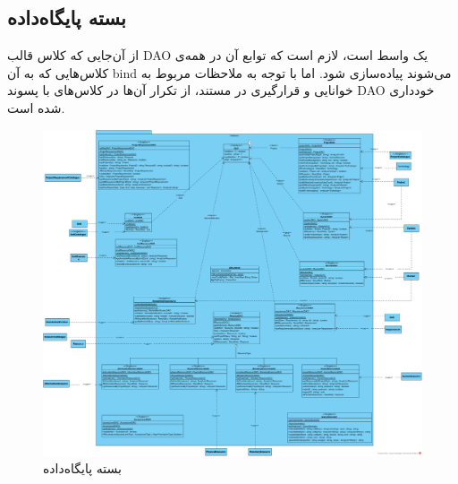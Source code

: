 \begin{landscape}
\section{بسته پایگاه‌داده}
از آن‌جایی که کلاس قالب
 DAO یک واسط است، لازم است که توابع آن در همه‌ی کلاس‌هایی که به آن bind می‌شوند پیاده‌سازی شود. اما با توجه به ملاحظات مربوط به خوانایی و قرارگیری در مستند، از تکرار آن‌ها در کلاس‌های با پسوند DAO خودداری شده است.
\begin{figure}[H]
	\centering
	\includegraphics[scale=0.45]{img/class-design/DatabasePackage}
	\caption{بسته پایگاه‌داده}
\end{figure}
\end{landscape}


